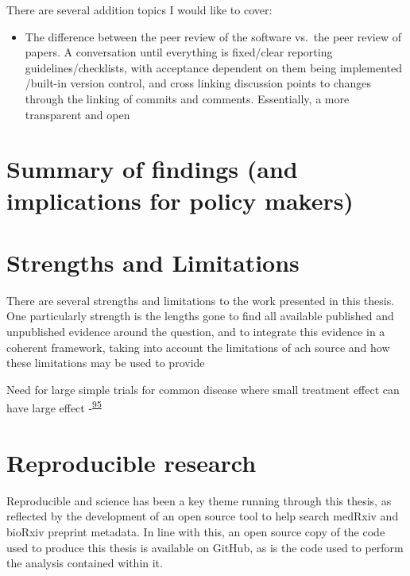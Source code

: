 \documentclass[a4paper, twoside]{templates/ociamthesis}
\providecommand{\tightlist}{%
  \setlength{\itemsep}{0pt}\setlength{\parskip}{0pt}}
\begin{document}
There are several addition topics I would like to cover:

\begin{itemize}
\tightlist
\item
  The difference between the peer review of the software vs.~the peer review of papers. A conversation until everything is fixed/clear reporting guidelines/checklists, with acceptance dependent on them being implemented /built-in version control, and cross linking discussion points to changes through the linking of commits and comments. Essentially, a more transparent and open
\end{itemize}

\hypertarget{summary-of-findings-and-implications-for-policy-makers}{%
\section{Summary of findings (and implications for policy makers)}\label{summary-of-findings-and-implications-for-policy-makers}}

\hypertarget{strengths-and-limitations-1}{%
\section{Strengths and Limitations}\label{strengths-and-limitations-1}}

There are several strengths and limitations to the work presented in this thesis. One particularly strength is the lengths gone to find all available published and unpublished evidence around the question, and to integrate this evidence in a coherent framework, taking into account the limitations of ach source and how these limitations may be used to provide

Need for large simple trials for common disease where small treatment effect can have large effect -\textsuperscript{\protect\hyperlink{ref-yusuf1984}{95}}

\hypertarget{reproducible-research}{%
\section{Reproducible research}\label{reproducible-research}}

Reproducible and science has been a key theme running through this thesis, as reflected by the development of an open source tool to help search medRxiv and bioRxiv preprint metadata. In line with this, an open source copy of the code used to produce this thesis is available on GitHub, as is the code used to perform the analysis contained within it.
\end{document}
